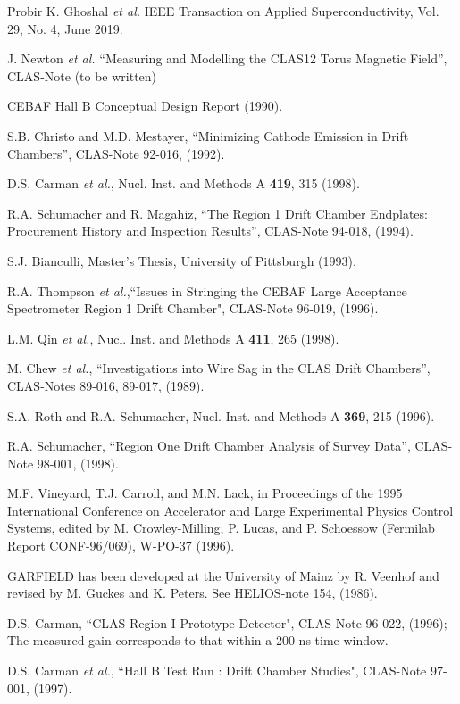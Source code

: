 \begin{thebibliography}{99}
 Probir K. Ghoshal {\it et al.} IEEE Transaction on Applied Superconductivity, Vol. 29, No. 4, June 2019.

J. Newton {\it et al.} ``Measuring and Modelling the CLAS12 Torus Magnetic Field'', CLAS-Note (to be written)






CEBAF Hall B Conceptual Design Report (1990).




S.B. Christo and M.D. Mestayer, ``Minimizing Cathode Emission in Drift 
Chambers'', CLAS-Note 92-016, (1992).















D.S. Carman {\it et al.}, Nucl. Inst. and Methods A {\bf 419}, 315 (1998).

R.A. Schumacher and R. Magahiz, ``The Region 1 Drift Chamber 
Endplates: Procurement History and Inspection Results'', CLAS-Note 
94-018, (1994).

S.J. Bianculli, Master's Thesis, University of Pittsburgh (1993).

R.A. Thompson {\it et al.},``Issues in Stringing the CEBAF Large 
Acceptance Spectrometer Region 1 Drift Chamber", CLAS-Note 96-019, 
(1996).

 L.M. Qin {\it et al.}, Nucl. Inst. and Methods A {\bf 411}, 265 (1998).

 M. Chew {\it et al.}, ``Investigations into Wire Sag in the
CLAS Drift Chambers'', CLAS-Notes 89-016, 89-017, (1989).

S.A. Roth and R.A. Schumacher, Nucl. Inst. and Methods A {\bf 369}, 215 (1996).

R.A. Schumacher, ``Region One Drift Chamber Analysis of Survey Data'',
CLAS-Note 98-001, (1998).



M.F. Vineyard, T.J. Carroll, and M.N. Lack, in Proceedings of the 1995 International
Conference on Accelerator and Large Experimental Physics Control Systems, 
edited by M. Crowley-Milling, P. Lucas, and P. Schoessow (Fermilab Report 
CONF-96/069), W-PO-37 (1996).

GARFIELD has been developed at the University of Mainz by R. Veenhof and
revised by M. Guckes and K. Peters.  See HELIOS-note 154, (1986).

D.S. Carman, ``CLAS Region I Prototype Detector", CLAS-Note 96-022,
(1996); The measured gain corresponds to that within a 200 ns time window.

D.S. Carman {\it et al.}, ``Hall B Test Run : Drift Chamber Studies", CLAS-Note
97-001, (1997).

\end{thebibliography}
